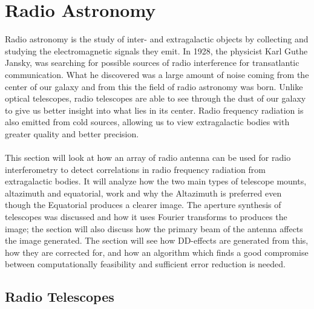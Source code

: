 \section{Radio Astronomy}\label{ra}
Radio astronomy is the study of inter- and extragalactic objects by collecting and studying the electromagnetic signals they emit. In 1928, the physicist Karl Guthe Jansky, was searching for possible sources of radio interference for transatlantic communication. What he discovered was a large amount of noise coming from the center of our galaxy and from this the field of radio astronomy was born. Unlike optical telescopes, radio telescopes are able to see through the dust of our galaxy to give us better insight into what lies in its center. Radio frequency radiation is also emitted from cold sources, allowing us to view extragalactic bodies with greater quality and better precision\citep{radio_intro}.
\\
\\
This section will look at how an array of radio antenna can be used for radio interferometry to detect correlations in radio frequency radiation from extragalactic bodies. It will analyze how the two main types of telescope mounts, altazimuth and equatorial, work and why the Altazimuth is preferred even though the Equatorial produces a clearer image. The aperture synthesis of telescopes was discussed and how it uses Fourier transforms to produces the image; the section will also discuss how the primary beam of the antenna affects the image generated. The section will see how DD-effects are generated from this, how they are corrected for, and how an algorithm which finds a good compromise between computationally feasibility and sufficient error reduction is needed.
\subsection{Radio Telescopes}\label{ra:sec:rt}
%

